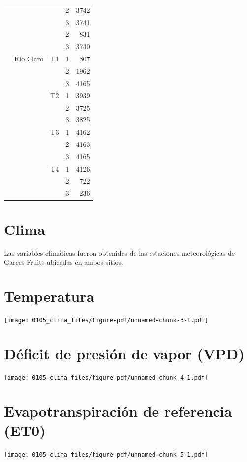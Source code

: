 \documentclass[
  letterpaper,
  DIV=11,
  numbers=noendperiod]{scrreprt}
\begin{document}
\begin{longtable}[]{@{}llllr@{}}
& & & 2 & 3742 \\
& & & 3 & 3741 \\
& & & 2 & 831 \\
& & & 3 & 3740 \\
& Rio Claro & T1 & 1 & 807 \\
& & & 2 & 1962 \\
& & & 3 & 4165 \\
& & T2 & 1 & 3939 \\
& & & 2 & 3725 \\
& & & 3 & 3825 \\
& & T3 & 1 & 4162 \\
& & & 2 & 4163 \\
& & & 3 & 4165 \\
& & T4 & 1 & 4126 \\
& & & 2 & 722 \\
& & & 3 & 236 \\
\end{longtable}

\chapter{Clima}\label{clima}

Las variables climáticas fueron obtenidas de las estaciones
meteorológicas de Garces Fruits ubicadas en ambos sitios.

\chapter{Temperatura}

\begin{center}
\texttt{[image: 0105\_clima\_files/figure-pdf/unnamed-chunk-3-1.pdf]}
\end{center}

\chapter{Déficit de presión de vapor (VPD)}

\begin{center}
\texttt{[image: 0105\_clima\_files/figure-pdf/unnamed-chunk-4-1.pdf]}
\end{center}

\chapter{Evapotranspiración de referencia (ET0)}

\begin{center}
\texttt{[image: 0105\_clima\_files/figure-pdf/unnamed-chunk-5-1.pdf]}
\end{center}
\end{document}
